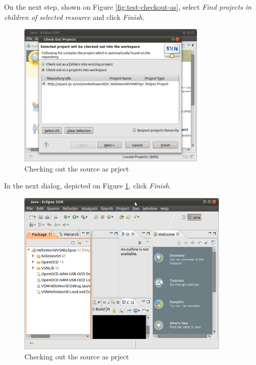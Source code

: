 \documentclass[a4paper, 10pt]{article}
\begin{document}
On the next step, shown on Figure \ref{fig:test-checkout-as}, select
\emph{Find projects in children of selected resource} and click \emph{Finish}.

    \begin{figure}[H]
    \centering
        \includegraphics[width=0.8\textwidth]{./png-install-guide/test-project-select.png}
        \caption{Checking out the source as prject}
        \label{fig:test-project-select}
    \end{figure}

In the next dialog, depicted on
Figure \ref{fig:test-project-select},
click \emph{Finish}.

    \begin{figure}[H]
    \centering
        \includegraphics[width=0.9\textwidth]{./png-install-guide/test-got-project.png}
        \caption{Checking out the source as prject}
        \label{fig:test-got-project}
    \end{figure}
\end{document}
